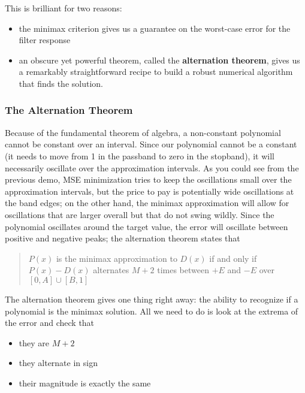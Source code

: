 \documentclass[11pt]{article}
\providecommand{\tightlist}{%
      \setlength{\itemsep}{0pt}\setlength{\parskip}{0pt}}
\begin{document}
This is brilliant for two reasons:

\begin{itemize}
\tightlist
\item
  the minimax criterion gives us a guarantee on the worst-case error for
  the filter response
\item
  an obscure yet powerful theorem, called the \textbf{alternation
  theorem}, gives us a remarkably straightforward recipe to build a
  robust numerical algorithm that finds the solution.
\end{itemize}

    \subsubsection{The Alternation Theorem}\label{the-alternation-theorem}

Because of the fundamental theorem of algebra, a non-constant polynomial
cannot be constant over an interval. Since our polynomial cannot be a
constant (it needs to move from 1 in the passband to zero in the
stopband), it will necessarily oscillate over the approximation
intervals. As you could see from the previous demo, MSE minimization
tries to keep the oscillations small over the approximation intervals,
but the price to pay is potentially wide oscillations at the band edges;
on the other hand, the minimax approximation will allow for oscillations
that are larger overall but that do not swing wildly. Since the
polynomial oscillates around the target value, the error will oscillate
between positive and negative peaks; the alternation theorem states that

\begin{quote}
\(P(x)\) is the minimax approximation to \(D(x)\) if and only if
\(P(x) - D(x)\) alternates \(M+2\) times between \(+E\) and \(-E\) over
\([0,A]\cup [B,1]\)
\end{quote}

The alternation theorem gives one thing right away: the ability to
recognize if a polynomial is the minimax solution. All we need to do is
look at the extrema of the error and check that

\begin{itemize}
\tightlist
\item
  they are \(M+2\)
\item
  they alternate in sign
\item
  their magnitude is exactly the same
\end{itemize}
\end{document}
